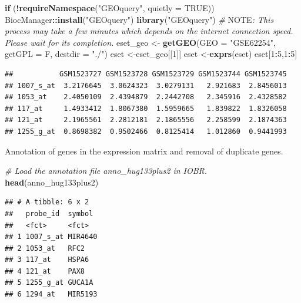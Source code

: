 \documentclass[
  12pt,
]{book}
\newenvironment{Shaded}{\begin{snugshade}}{\end{snugshade}}
\newcommand{\AlertTok}[1]{\textcolor[rgb]{0.94,0.16,0.16}{#1}}
\newcommand{\AttributeTok}[1]{\textcolor[rgb]{0.13,0.29,0.53}{#1}}
\newcommand{\CommentTok}[1]{\textcolor[rgb]{0.56,0.35,0.01}{\textit{#1}}}
\newcommand{\ConstantTok}[1]{\textcolor[rgb]{0.56,0.35,0.01}{#1}}
\newcommand{\ControlFlowTok}[1]{\textcolor[rgb]{0.13,0.29,0.53}{\textbf{#1}}}
\newcommand{\DecValTok}[1]{\textcolor[rgb]{0.00,0.00,0.81}{#1}}
\newcommand{\FunctionTok}[1]{\textcolor[rgb]{0.13,0.29,0.53}{\textbf{#1}}}
\newcommand{\NormalTok}[1]{#1}
\newcommand{\OtherTok}[1]{\textcolor[rgb]{0.56,0.35,0.01}{#1}}
\newcommand{\SpecialCharTok}[1]{\textcolor[rgb]{0.81,0.36,0.00}{\textbf{#1}}}
\newcommand{\StringTok}[1]{\textcolor[rgb]{0.31,0.60,0.02}{#1}}
\begin{document}
\begin{Shaded}
\begin{Highlighting}[]
\ControlFlowTok{if}\NormalTok{ (}\SpecialCharTok{!}\FunctionTok{requireNamespace}\NormalTok{(}\StringTok{"GEOquery"}\NormalTok{, }\AttributeTok{quietly =} \ConstantTok{TRUE}\NormalTok{))  BiocManager}\SpecialCharTok{::}\FunctionTok{install}\NormalTok{(}\StringTok{"GEOquery"}\NormalTok{)}
\FunctionTok{library}\NormalTok{(}\StringTok{"GEOquery"}\NormalTok{)}
\CommentTok{\# }\AlertTok{NOTE}\CommentTok{: This process may take a few minutes which depends on the internet connection speed. Please wait for its completion.}
\NormalTok{eset\_geo }\OtherTok{\textless{}{-}} \FunctionTok{getGEO}\NormalTok{(}\AttributeTok{GEO =} \StringTok{"GSE62254"}\NormalTok{, }\AttributeTok{getGPL  =}\NormalTok{ F, }\AttributeTok{destdir =} \StringTok{"./"}\NormalTok{)}
\NormalTok{eset    }\OtherTok{\textless{}{-}}\NormalTok{eset\_geo[[}\DecValTok{1}\NormalTok{]]}
\NormalTok{eset    }\OtherTok{\textless{}{-}}\FunctionTok{exprs}\NormalTok{(eset)}
\NormalTok{eset[}\DecValTok{1}\SpecialCharTok{:}\DecValTok{5}\NormalTok{,}\DecValTok{1}\SpecialCharTok{:}\DecValTok{5}\NormalTok{]}
\end{Highlighting}
\end{Shaded}

\begin{verbatim}
##           GSM1523727 GSM1523728 GSM1523729 GSM1523744 GSM1523745
## 1007_s_at  3.2176645  3.0624323  3.0279131   2.921683  2.8456013
## 1053_at    2.4050109  2.4394879  2.2442708   2.345916  2.4328582
## 117_at     1.4933412  1.8067380  1.5959665   1.839822  1.8326058
## 121_at     2.1965561  2.2812181  2.1865556   2.258599  2.1874363
## 1255_g_at  0.8698382  0.9502466  0.8125414   1.012860  0.9441993
\end{verbatim}

Annotation of genes in the expression matrix and removal of duplicate genes.

\begin{Shaded}
\begin{Highlighting}[]
\CommentTok{\# Load the annotation file \textasciigrave{}anno\_hug133plus2\textasciigrave{} in IOBR.}
\FunctionTok{head}\NormalTok{(anno\_hug133plus2)}
\end{Highlighting}
\end{Shaded}

\begin{verbatim}
## # A tibble: 6 x 2
##   probe_id  symbol 
##   <fct>     <fct>  
## 1 1007_s_at MIR4640
## 2 1053_at   RFC2   
## 3 117_at    HSPA6  
## 4 121_at    PAX8   
## 5 1255_g_at GUCA1A 
## 6 1294_at   MIR5193
\end{verbatim}
\end{document}
